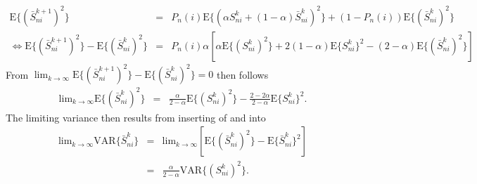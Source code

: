 \begin{eqnarray}
\text{E}\{(\bar{S}_{ni}^{k+1})^{2}\} 
& = & 
P_{n}(i)\text{E}\{(\alpha S_{ni}^{k}+(1-\alpha)\bar{S}_{ni}^{k})^{2}\}+(1-P_{n}(i))\text{E}\{(\bar{S}_{ni}^{k})^{2}\}\\
\Leftrightarrow
\text{E}\{(\bar{S}_{ni}^{k+1})^{2}\}-\text{E}\{(\bar{S}_{ni}^{k})^{2}\} 
& = & P_{n}(i) \alpha \left[\alpha\text{E}\{(S_{ni}^{k})^{2}\}+2(1-\alpha)\text{E}\{S_{ni}^{k}\}^{2}-(2-\alpha)\text{E}\{(\bar{S}_{ni}^{k})^{2}\}\right]
\end{eqnarray}
From $\lim_{k\rightarrow\infty}\text{E}\{(\bar{S}_{ni}^{k+1})^{2}\}-\text{E}\{(\bar{S}_{ni}^{k})^{2}\}=0$
then follows
\begin{eqnarray}
\text{lim}_{k\rightarrow\infty}\text{E}\{(\bar{S}_{ni}^{k})^{2}\} 
& = & 
\frac{\alpha}{2-\alpha}\text{E}\{(S_{ni}^{k})^{2}\}-\frac{2-2\alpha}{2-\alpha}\text{E}\{S_{ni}^{k}\}^{2}. \label{eq:second-score-moment}
\end{eqnarray}
%
The limiting variance then results from inserting of  and  into
\begin{eqnarray}
\text{lim}_{k\rightarrow\infty}\text{VAR}\{\bar{S}_{ni}^{k}\} 
& = & \text{lim}_{k\rightarrow\infty}\left[\text{E}\{(\bar{S}_{ni}^{k})^{2}\}-\text{E}\{\bar{S}_{ni}^{k}\}^{2}\right]\\
 & = & \frac{\alpha}{2-\alpha}\text{VAR}\{(S_{ni}^{k})^{2}\}.
\end{eqnarray}


